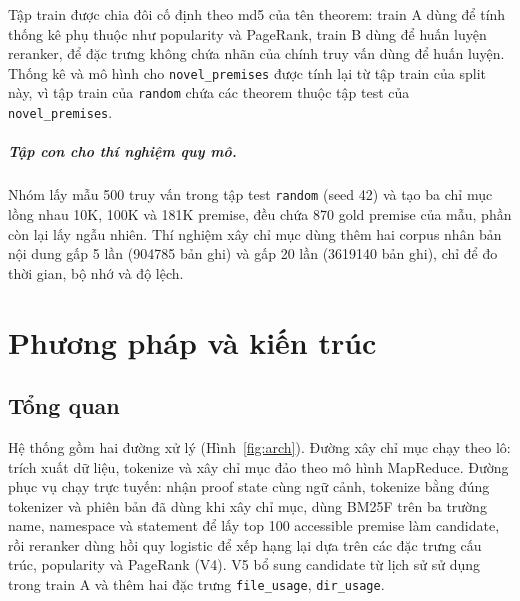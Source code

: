 \documentclass[11pt,a4paper,oneside]{report}
\newcommand{\code}[1]{\texttt{#1}}
\begin{document}
Tập train được chia đôi cố định theo md5 của tên theorem: train A dùng để tính thống kê phụ thuộc như popularity và
PageRank, train B dùng để huấn luyện reranker, để đặc trưng không chứa nhãn của chính truy vấn dùng để huấn luyện. Thống kê và mô
hình cho \code{novel\_premises} được tính lại từ tập train của split này, vì tập train của \code{random} chứa các
theorem thuộc tập test của \code{novel\_premises}.

\paragraph{Tập con cho thí nghiệm quy mô.} Nhóm lấy mẫu 500 truy vấn trong tập test \code{random} (seed 42) và tạo ba chỉ mục
lồng nhau 10K, 100K và 181K premise, đều chứa 870 gold premise của mẫu, phần còn lại lấy ngẫu nhiên. Thí nghiệm xây
chỉ mục dùng thêm hai corpus nhân bản nội dung gấp 5 lần (\num{904785} bản ghi) và gấp 20 lần (\num{3619140} bản ghi), chỉ
để đo thời gian, bộ nhớ và độ lệch.

%

\chapter{Phương pháp và kiến trúc}\label{sec:method}

\section{Tổng quan}

Hệ thống gồm hai đường xử lý (Hình~\ref{fig:arch}). Đường xây chỉ mục chạy theo lô: trích xuất dữ liệu, tokenize và
xây chỉ mục đảo theo mô hình MapReduce. Đường phục vụ chạy trực tuyến: nhận proof state cùng ngữ cảnh, tokenize bằng đúng
tokenizer và phiên bản đã dùng khi xây chỉ mục, dùng BM25F trên ba trường name, namespace và statement để lấy top 100
accessible premise làm candidate, rồi reranker dùng hồi quy logistic để xếp hạng lại dựa trên các đặc trưng cấu trúc,
popularity và PageRank (V4). V5 bổ sung candidate từ lịch sử sử dụng trong train A và thêm hai đặc trưng
\code{file\_usage}, \code{dir\_usage}.
\end{document}
